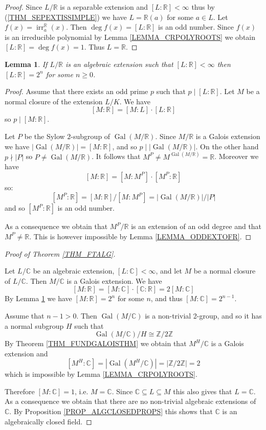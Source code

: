 \documentclass[12pt, letterpaper, oneside]{article}
\theoremstyle{plain}
\newtheorem{lemma}[theorem]{Lemma}
\theoremstyle{definition}
\newcommand{\Z}{{\mathbb Z}}
\newcommand{\R}{{\mathbb R}}
\newcommand{\C}{{\mathbb C}}
\newcommand{\irr}{\operatorname{irr}}
\newcommand{\Gal}{\operatorname{Gal}}
\newcommand{\vs}{\vskip 5mm}
\begin{document}
\vs

\begin{proof}
Since $L/\R$ is a separable extension and $[L:\R]< \infty$ thus by (\ref{THM_SEPEXTISSIMPLE})
we have $L = \R(a)$ for some $a\in L$. Let $f(x) = \irr^{\R}_{a}(x)$. 
Then $\deg f(x) = [L:\R]$ is an odd number. Since $f(x)$ is an irreducible polynomial by 
Lemma \ref{LEMMA_CRPOLYROOTS} we obtain $[L:\R] = \deg f(x)  =1$. Thus
$L = \R$. 
\end{proof}


\vs\vs

\begin{lemma}
\label{LEMMA_RALGEXTS}
If $L/\R$ is an algebraic extension such that  $[L:\R] < \infty$ then $[L:\R] = 2^{n}$ 
for some $n\geq 0$. 
\end{lemma}


\vs

\begin{proof}
Assume that there exists an odd prime  $p$ such that $p\mid [L:\R]$. Let $M$ be a normal closure 
of the extension $L/K$. We have 
$$[M:\R] = [M:L]\cdot [L:\R]$$
so $p\mid [M: \R]$. 

Let $P$ be the Sylow $2$-subgroup of $\Gal(M/\R)$. Since $M/\R$ is a Galois extension we have 
$|\Gal(M/\R)| = [M:\R]$, and so $p\mid |\Gal(M/\R)|$. On the other hand  
$p\nmid |P|$ so  $P\neq \Gal(M/\R)$. It follows that $M^{P} \neq M^{\Gal(M/\R)} = \R$. 
Moreover we have 
$$[M:\R] = [M:M^{P}]\cdot [M^{P}: \R] $$
so: 
$$[M^{P}:\R] = [M:\R]/[M:M^{P}] = |\Gal(M/\R)|/|P|$$
and so $[M^{P}:\R]$ is an odd number. 

As a consequence we obtain that $M^{P}/\R$ is an extension of an odd degree and that 
$M^{P}\neq \R$. This is however impossible by Lemma \ref{LEMMA_ODDEXTOFR}. 



\end{proof}

\vs\vs


\begin{proof}[Proof of Theorem \ref{THM_FTALG}]  \ 

Let $L/\C$ be an algebraic extension, $[L:\C]< \infty$,  and let 
$M$ be a normal closure of $L/\C$. Then $M/\C$ is a Galois extension. 
We have 
$$[M:\R] = [M:\C]\cdot [\C: \R] = 2[M:\C]$$
By Lemma \ref{LEMMA_RALGEXTS}  we have $[M:\R] = 2^{n}$ for some $n$,  and thus 
$[M:\C] = 2^{n-1}$. 

Assume that $n-1>0$. Then  $\Gal(M/\C)$ is a non-trivial 2-group, and so it has 
a normal subgroup $H$ such that 
$$\Gal(M/\C)/H \cong \Z/2\Z$$
By Theorem \ref{THM_FUNDGALOISTHM} we obtain that $M^{H}/\C$ is 
a Galois extension and
$$[M^{H}:\C] = |\Gal(M^{H}/\C)| = |\Z/2\Z|=2$$
which is impossible by Lemma \ref{LEMMA_CRPOLYROOTS}. 

Therefore  $[M:\C] = 1$, i.e. $M = \C$. Since $\C \subseteq L \subseteq M$
this also gives that $L = \C$.  As a consequence  we obtain that there are 
no non-trivial algebraic extensions of $\C$.  By Proposition \ref{PROP_ALGCLOSEDPROPS}
this shows that $\C$ is an algebraically closed field. 
\end{proof}
\end{document}
